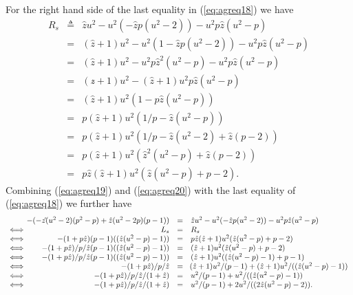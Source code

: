 \documentclass[10pt]{article}
\begin{document}
For the right hand side of the last equality in (\ref{eq:agreq18}) we have
 \begin{eqnarray}
R_s & \triangleq &
\hat{z}u^2- u^2(-\hat{z}p(u^2-2))-u^2p\hat{z}(u^2-p)   \nonumber \\
  & = &   (\hat{z}+1)u^2- u^2(1-\hat{z}p(u^2-2))-u^2p\hat{z}(u^2-p)
  \nonumber \\
  & = &  (\hat{z}+1)u^2- u^2 p\hat{z}^2(u^2-p)-u^2 p\hat{z}(u^2-p)
  \nonumber \\
  & = &  (z\hat{}+1)u^2-(\hat{z}+1) u^2 p\hat{z}(u^2-p)
  \nonumber \\
  & = &   (\hat{z}+1)u^2(1-p\hat{z}(u^2-p))
  \nonumber \\
  & = &   p(\hat{z}+1)u^2 (1/p-\hat{z}(u^2-p))
  \nonumber \\
  & = &  p(\hat{z}+1)u^2(1/p-\hat{z}(u^2-2)+\hat{z}(p-2))
  \nonumber \\
  & = &  p(\hat{z}+1)u^2(\hat{z}^2(u^2-p)+\hat{z}(p-2))
  \nonumber \\
  & = &  p\hat{z}(\hat{z}+1)u^2(\hat{z}(u^2-p)+p-2).
 \label{eq:agreq20}
  \end{eqnarray}
Combining (\ref{eq:agreq19}) and (\ref{eq:agreq20}) with the last equality of (\ref{eq:agreq18}) we further have
 \begin{eqnarray}
\begin{array}{lrclcl}
  & \hspace{-.3in}  -(-z\hat{}(u^2-2)(p^2-p) + \hat{z}(u^2-2p)(p-1) )    & = &  \hat{z}u^2- u^2(-\hat{z}p(u^2-2))-u^2p\hat{z}(u^2-p)   \\
\Longleftrightarrow \quad $ $ &  L_s  & = & R_s\\
\Longleftrightarrow \quad $ $ &   -(1+p\hat{z})(p-1)((\hat{z}(u^2-p)-1))    & = & p\hat{z}(\hat{z}+1)u^2(\hat{z}(u^2-p)+p-2) \\
\Longleftrightarrow \quad $ $ &   -(1+p\hat{z})/p/\hat{z}(p-1)((\hat{z}(u^2-p)-1))  & = &    (\hat{z}+1)u^2(\hat{z}(u^2-p)+p-2)  \\
\Longleftrightarrow \quad $ $ &   -(1+p\hat{z})/p/\hat{z}(p-1)((\hat{z}(u^2-p)-1))  & = &    (\hat{z}+1)u^2((\hat{z}(u^2-p)-1)+p-1)  \\
\Longleftrightarrow \quad $ $ &  -(1+p\hat{z})/p/\hat{z}   & = & \hspace{-.02in} (\hat{z}+1)u^2/(p-1)+(\hat{z}+1)u^2/((\hat{z}(u^2-p)-1))  \\
\Longleftrightarrow \quad $ $ &   -(1+p\hat{z})/p/\hat{z}/(1+\hat{z})   & = &    u^2/(p-1)+u^2/((\hat{z}(u^2-p)-1))\\
\Longleftrightarrow \quad $ $ &   -(1+p\hat{z})/p/\hat{z}/(1+\hat{z})   & = &  u^2/(p-1)+2u^2/((2\hat{z}(u^2-p)-2)).
  \end{array}\nonumber \\ \label{eq:agreq21}
  \end{eqnarray}
\end{document}
